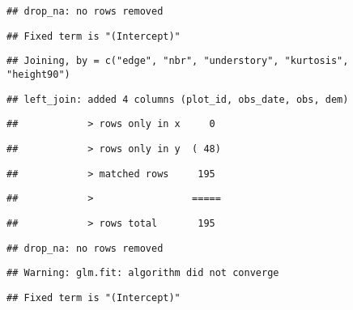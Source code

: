 \documentclass[
]{article}
\begin{document}
\begin{verbatim}
## drop_na: no rows removed
\end{verbatim}

\begin{verbatim}
## Fixed term is "(Intercept)"
\end{verbatim}

\begin{verbatim}
## Joining, by = c("edge", "nbr", "understory", "kurtosis", "height90")
\end{verbatim}

\begin{verbatim}
## left_join: added 4 columns (plot_id, obs_date, obs, dem)
\end{verbatim}

\begin{verbatim}
##            > rows only in x     0
\end{verbatim}

\begin{verbatim}
##            > rows only in y  ( 48)
\end{verbatim}

\begin{verbatim}
##            > matched rows     195
\end{verbatim}

\begin{verbatim}
##            >                 =====
\end{verbatim}

\begin{verbatim}
##            > rows total       195
\end{verbatim}

\begin{verbatim}
## drop_na: no rows removed
\end{verbatim}

\begin{verbatim}
## Warning: glm.fit: algorithm did not converge
\end{verbatim}

\begin{verbatim}
## Fixed term is "(Intercept)"
\end{verbatim}
\end{document}
